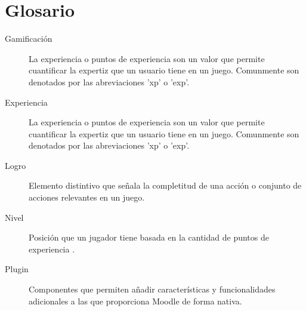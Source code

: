 \chapter{Glosario}


\newcommand{\term}[2]{\item[\hypertarget{#1}{#2}]}
\newenvironment{glosario}{\begin{description}}{\end{description}}

\begin{glosario}

    \term{tGamificacion}{Gamificación} La experiencia o puntos de experiencia son un 
    valor que permite cuantificar la expertiz que un usuario tiene en un juego. 
    Comunmente son denotados por las abreviaciones 'xp' o 'exp'.

    \item[Experiencia] La experiencia o puntos de experiencia son un valor que 
    permite cuantificar la expertiz que un usuario tiene en un juego. Comunmente 
    son denotados por las abreviaciones 'xp' o 'exp'.
    
    \item[Logro] Elemento distintivo que señala la completitud de una acción o conjunto de 
    acciones relevantes en un juego.
    
    \item[Nivel] Posición que un jugador tiene basada en la cantidad de puntos de 
    experiencia \cite[p. 197]{conveptosVJNiveles}.
    
    \item[Plugin] Componentes que permiten añadir características y funcionalidades
    adicionales a las que proporciona Moodle de forma nativa.
    
\end{glosario}










